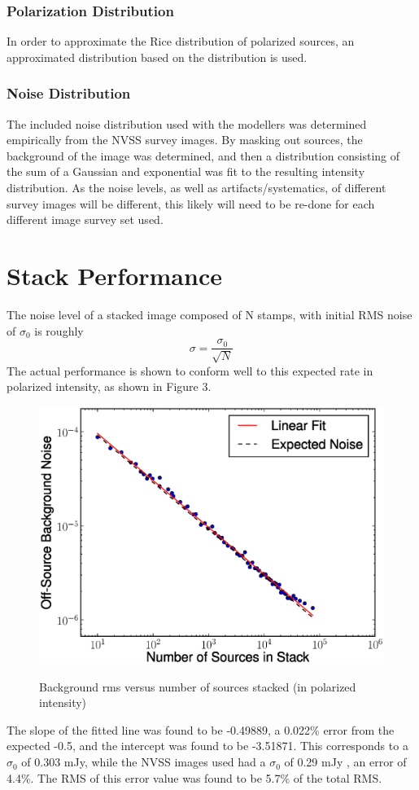 \documentclass{article}
\begin{document}
\subsubsection{Polarization Distribution}
In order to approximate the Rice distribution of polarized sources, an
approximated distribution based on the \cite[Beck \& Gaensler 2004]{BandG2004}
distribution is used.

\subsubsection{Noise Distribution}
The included noise distribution used with the modellers was determined 
empirically from the NVSS survey images.  By masking out sources, the background
of the image was determined, and then a distribution consisting of the sum of a
Gaussian and exponential \cite[Stil et. al 2010]{stil2010} was fit to the 
resulting intensity distribution.  As the noise levels, as well as 
artifacts/systematics, of different survey images will be different, this 
likely will need to be re-done for each different image survey set used.

\section{Stack Performance}
The noise level of a stacked image composed of N stamps, with initial RMS noise of $\sigma_0$ is roughly 
$$ \sigma = \frac{\sigma_0}{\sqrt{N}}$$
The actual performance is shown to conform well to this expected rate in 
polarized intensity, as shown in Figure 3.
\begin{figure}[H]
\centering
\includegraphics[trim=0cm 0cm 0cm 0cm, clip, scale=0.7]{Noise_vs_Num.eps}\\
\caption[Stacking Performance for NVSS PI]{Background rms versus number of 
sources stacked (in polarized intensity)}
\end{figure}
The slope of the fitted line was found to be -0.49889, a 0.022\% error from the expected -0.5, and the intercept was found to be -3.51871.  This corresponds
to a $\sigma_0$ of 0.303 mJy, while the NVSS images used had a $\sigma_0$ of 
0.29 mJy \cite[Condon et al. 1998]{NVSS1998}, an error of 4.4\%.  The RMS of 
this error value was found to be 5.7\% of the total RMS.\par
\end{document}
